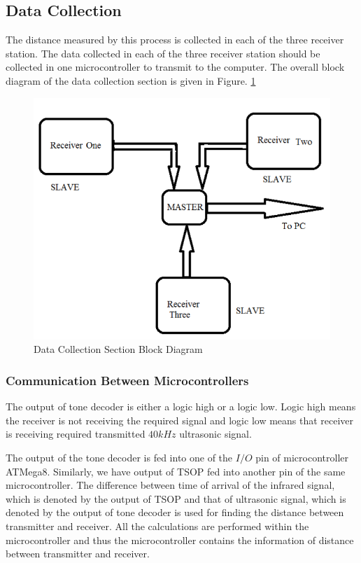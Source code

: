 \subsection{Data Collection}
The distance measured by this process is collected in each of the three receiver station. The data collected in each of the three receiver station should be collected in one microcontroller to transmit to the computer.  The overall block diagram of the data collection section is given in Figure. \ref{fig:MasterSlave}

\begin{figure}[h!]
	\centering
	\includegraphics[width=120mm]{Images/MasterSlave.png}
	\caption{Data Collection Section Block Diagram}
	\label{fig:MasterSlave}
\end{figure}


\subsubsection{Communication Between Microcontrollers}
The output of tone decoder is either a logic high or a logic low. Logic high means the receiver is not receiving the required signal and logic low means that receiver is receiving required transmitted $40kHz$ ultrasonic signal.

The output of the tone decoder is fed into one of the $I/O$ pin of microcontroller ATMega8. Similarly, we have output of TSOP fed into another pin of the same microcontroller. The difference between time of arrival of the infrared signal, which is denoted by the output of TSOP and that of ultrasonic signal, which is denoted by the output of tone decoder is used for finding the distance between transmitter and receiver. All the calculations are performed within the microcontroller and thus the microcontroller contains the information of distance between transmitter and receiver.

